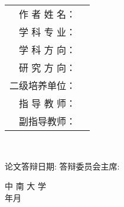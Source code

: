 \begin{center}
	\begin{tabular}{>{\songti}r >{\songti}l}
		作 者 姓 名：\quad     &\myName  \\
		学 科 专 业：\quad               &\major  \\
		学 科 方 向：\quad               &\discipline  \\
		研 究 方 向：\quad               &\researchTopic  \\
		二级培养单位：\quad    & \school \\
		指 导 教 师：\quad               &\mySupervisor\\
		副指导教师：\quad               &\myAssociateSupervisor\\
	\end{tabular}\\
	\vspace{3em}
	
	{\songti {} 论文答辩日期:\uline{\makebox[8.5em][c]{}}}
	\hfill
	{\songti {} 答辩委员会主席:\uline{\makebox[5em][c]{}}}
	
	\vspace{3em}
	{\songti {} 中 南 大 学\\  年 月}        
\end{center}
\newpage \thispagestyle{empty}~